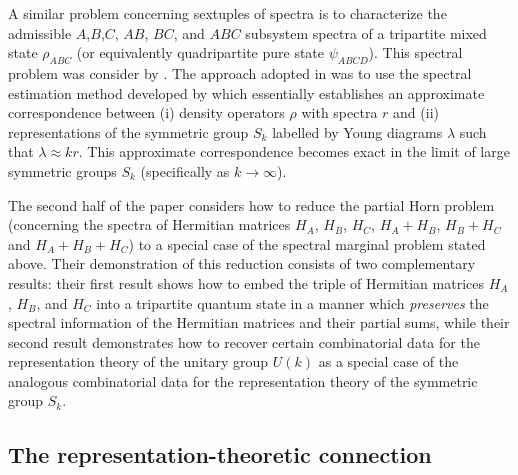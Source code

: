 \documentclass[notitlepage]{article}
\begin{document}
A similar problem concerning sextuples of spectra is to characterize the admissible $A$,$B$,$C$, $AB$, $BC$, and $ABC$ subsystem spectra of a tripartite mixed state $\rho_{ABC}$ (or equivalently quadripartite pure state $\psi_{ABCD}$). 
This spectral problem was consider by \citeauthor{christandl2018recoupling} \cite{christandl2018recoupling}.
The approach adopted in \cite{christandl2018recoupling} was to use the spectral estimation method developed by \citeauthor{keyl2001estimating} \cite{keyl2001estimating} which essentially establishes an approximate correspondence between (i) density operators $\rho$ with spectra $r$ and (ii) representations of the symmetric group $S_k$ labelled by Young diagrams $\lambda$ such that $\lambda \approx k r$.
This approximate correspondence becomes exact in the limit of large symmetric groups $S_k$ (specifically as $k \to \infty$).

The second half of the paper \cite{christandl2018recoupling} considers how to reduce the partial Horn problem (concerning the spectra of Hermitian matrices $H_A$, $H_B$, $H_C$, $H_A + H_B$, $H_B + H_C$ and $H_A + H_B + H_C$) to a special case of the spectral marginal problem stated above.
Their demonstration of this reduction consists of two complementary results:
their first result shows how to embed the triple of Hermitian matrices $H_A$, $H_B$, and $H_C$ into a tripartite quantum state in a manner which \textit{preserves} the spectral information of the Hermitian matrices and their partial sums,
while their second result demonstrates how to recover certain combinatorial data for the representation theory of the unitary group $U(k)$ as a special case of the analogous combinatorial data for the representation theory of the symmetric group $S_k$.

\subsection{The representation-theoretic connection}
\end{document}
